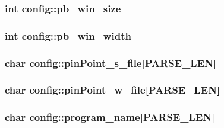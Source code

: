 \hypertarget{classconfig_a5dde15659f2775908ca310ed84270a8d}{
\subsubsection[{pb\_\-win\_\-size}]{\setlength{\rightskip}{0pt plus 5cm}int {\bf config::pb\_\-win\_\-size}}}
\label{classconfig_a5dde15659f2775908ca310ed84270a8d}
\hypertarget{classconfig_a8c866969fe846bf930fa583e0afb83b5}{
\subsubsection[{pb\_\-win\_\-width}]{\setlength{\rightskip}{0pt plus 5cm}int {\bf config::pb\_\-win\_\-width}}}
\label{classconfig_a8c866969fe846bf930fa583e0afb83b5}
\hypertarget{classconfig_a325327ce309f0152ce4e1a45bb097b09}{
\subsubsection[{pinPoint\_\-s\_\-file}]{\setlength{\rightskip}{0pt plus 5cm}char {\bf config::pinPoint\_\-s\_\-file}\mbox{[}PARSE\_\-LEN\mbox{]}}}
\label{classconfig_a325327ce309f0152ce4e1a45bb097b09}
\hypertarget{classconfig_afc8eae6d38b6e75182bb7a93c46542e3}{
\subsubsection[{pinPoint\_\-w\_\-file}]{\setlength{\rightskip}{0pt plus 5cm}char {\bf config::pinPoint\_\-w\_\-file}\mbox{[}PARSE\_\-LEN\mbox{]}}}
\label{classconfig_afc8eae6d38b6e75182bb7a93c46542e3}
\hypertarget{classconfig_a344b61d2beb7dec897796ef42ed00010}{
\subsubsection[{program\_\-name}]{\setlength{\rightskip}{0pt plus 5cm}char {\bf config::program\_\-name}\mbox{[}PARSE\_\-LEN\mbox{]}}}
